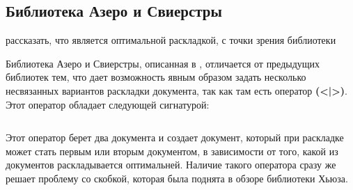 \newpage

\subsection{Библиотека Азеро и Свиерстры}

рассказать, что является оптимальной раскладкой, с точки зрения библиотеки

Библиотека Азеро и Свиерстры, описанная в \cite{swierstra}, отличается от предыдущих библиотек тем, что дает возможность явным образом задать несколько несвязанных вариантов раскладки документа, так как там есть оператор \textbf{(<|>)}. Этот оператор обладает следующей сигнатурой:
\inputminted{haskell}{codes/chooseSw.hs}
Этот оператор берет два документа и создает документ, который при раскладке может стать первым или вторым документом, в зависимости от того, какой из документов раскладывается оптимальней. Наличие такого оператора сразу же решает проблему со скобкой, которая была поднята в обзоре библиотеки Хьюза.